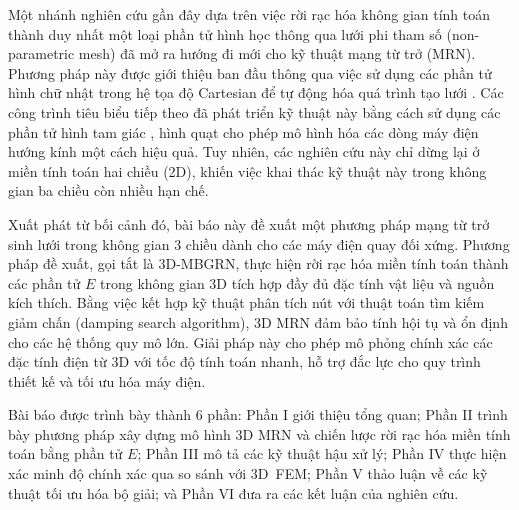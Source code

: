 Một nhánh nghiên cứu gần đây dựa trên việc rời rạc hóa không gian tính toán thành duy nhất một loại phần tử hình học thông qua lưới phi tham số (non-parametric mesh) đã mở ra hướng đi mới cho kỹ thuật mạng từ trở (MRN). Phương pháp này được giới thiệu ban đầu thông qua việc sử dụng các phần tử hình chữ nhật trong hệ tọa độ Cartesian để tự động hóa quá trình tạo lưới \cite{9473194}. Các công trình tiêu biểu tiếp theo đã phát triển kỹ thuật này bằng cách sử dụng các phần tử hình tam giác \cite{10018857,ouagued2016comparison}, hình quạt \cite{lu2023hybrid,10599821} cho phép mô hình hóa các dòng máy điện hướng kính một cách hiệu quả. Tuy nhiên, các nghiên cứu này chỉ dừng lại ở miền tính toán hai chiều (2D), khiến việc khai thác kỹ thuật này trong không gian ba chiều còn nhiều hạn chế.

Xuất phát từ bối cảnh đó, bài báo này đề xuất một phương pháp mạng từ trở sinh lưới trong không gian 3 chiều dành cho các máy điện quay đối xứng. Phương pháp đề xuất, gọi tắt là 3D-MBGRN, thực hiện rời rạc hóa miền tính toán thành các phần tử $E$ trong không gian 3D tích hợp đầy đủ đặc tính vật liệu và nguồn kích thích. Bằng việc kết hợp kỹ thuật phân tích nút với thuật toán tìm kiếm giảm chấn (damping search algorithm), 3D MRN đảm bảo tính hội tụ và ổn định cho các hệ thống quy mô lớn. Giải pháp này cho phép mô phỏng chính xác các đặc tính điện từ 3D với tốc độ tính toán nhanh, hỗ trợ đắc lực cho quy trình thiết kế và tối ưu hóa máy điện.

Bài báo được trình bày thành 6 phần: Phần I giới thiệu tổng quan; Phần II trình bày phương pháp xây dựng mô hình 3D MRN và chiến lược rời rạc hóa miền tính toán bằng phần tử $E$; Phần III mô tả các kỹ thuật hậu xử lý; Phần IV thực hiện xác minh độ chính xác qua so sánh với 3D~FEM; Phần V thảo luận về các kỹ thuật tối ưu hóa bộ giải; và Phần VI đưa ra các kết luận của nghiên cứu.